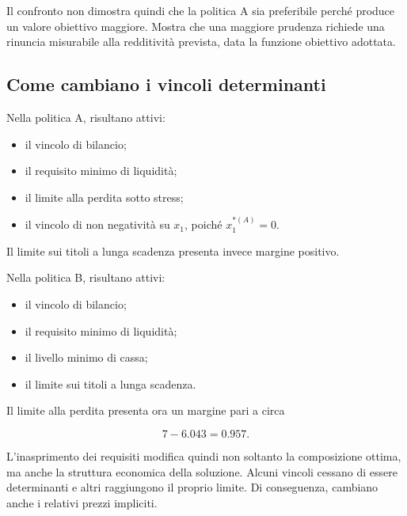 Il confronto non dimostra quindi che la politica A sia preferibile perch\'e
produce un valore obiettivo maggiore. Mostra che una maggiore prudenza
richiede una rinuncia misurabile alla redditivit\`a prevista, data la funzione
obiettivo adottata.

\subsection{Come cambiano i vincoli determinanti}

Nella politica A, risultano attivi:

\begin{itemize}

\item il vincolo di bilancio;

\item il requisito minimo di liquidit\`{a};

\item il limite alla perdita sotto stress;

\item il vincolo di non negativit\`{a} su $x_1$, poich\'{e}
$x_1^{*(A)}=0$.

\end{itemize}

Il limite sui titoli a lunga scadenza presenta invece margine positivo.

Nella politica B, risultano attivi:

\begin{itemize}

\item il vincolo di bilancio;

\item il requisito minimo di liquidit\`a;

\item il livello minimo di cassa;

\item il limite sui titoli a lunga scadenza.

\end{itemize}

Il limite alla perdita presenta ora un margine pari a circa

\[
7-6.043
=
0.957.
\]

L'inasprimento dei requisiti modifica quindi non soltanto la composizione
ottima, ma anche la struttura economica della soluzione. Alcuni vincoli
cessano di essere determinanti e altri raggiungono il proprio limite. Di
conseguenza, cambiano anche i relativi prezzi impliciti.

